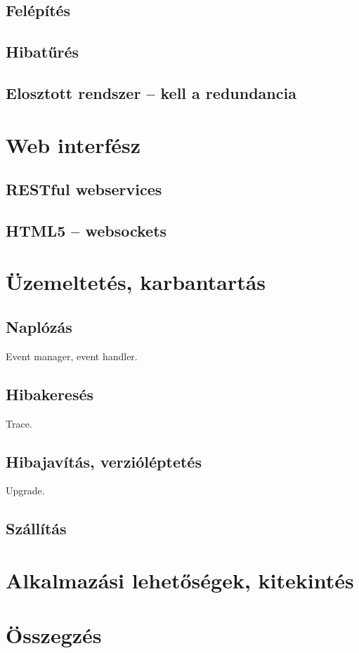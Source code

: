 \documentclass[12pt, a4paper, oneside]{book}
\begin{document}
\section{Felépítés}
\section{Hibatűrés}
\section{Elosztott rendszer -- kell a redundancia}

\chapter{Web interfész}
\section{RESTful webservices}
\section{HTML5 -- websockets}

\chapter{Üzemeltetés, karbantartás}
\section{Naplózás}
Event manager, event handler.
\section{Hibakeresés}
Trace.
\section{Hibajavítás, verzióléptetés}
Upgrade.
\section{Szállítás}

\chapter{Alkalmazási lehetőségek, kitekintés}

\chapter{Összegzés}
\appendix
\end{document}

